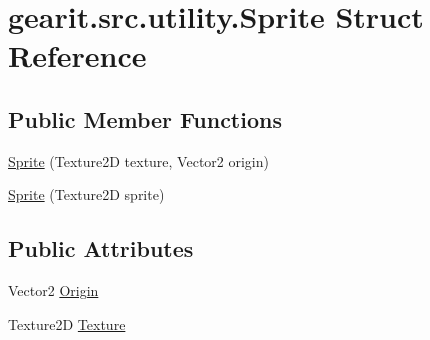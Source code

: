 \hypertarget{structgearit_1_1src_1_1utility_1_1_sprite}{\section{gearit.\+src.\+utility.\+Sprite Struct Reference}
\label{structgearit_1_1src_1_1utility_1_1_sprite}
}
\subsection*{Public Member Functions}
\begin{DoxyCompactItemize}
\item 
\hyperlink{structgearit_1_1src_1_1utility_1_1_sprite_ac5ca3a86df15ce06f229abf71bd8b97d}{Sprite} (Texture2\+D texture, Vector2 origin)
\item 
\hyperlink{structgearit_1_1src_1_1utility_1_1_sprite_a49f82d7074b50d4496a5856065bb9e40}{Sprite} (Texture2\+D sprite)
\end{DoxyCompactItemize}
\subsection*{Public Attributes}
\begin{DoxyCompactItemize}
\item 
Vector2 \hyperlink{structgearit_1_1src_1_1utility_1_1_sprite_ad713d03a171895b37dae49e94bc22dc1}{Origin}
\item 
Texture2\+D \hyperlink{structgearit_1_1src_1_1utility_1_1_sprite_a56eddd9af1685b731d691584618963b3}{Texture}
\end{DoxyCompactItemize}


